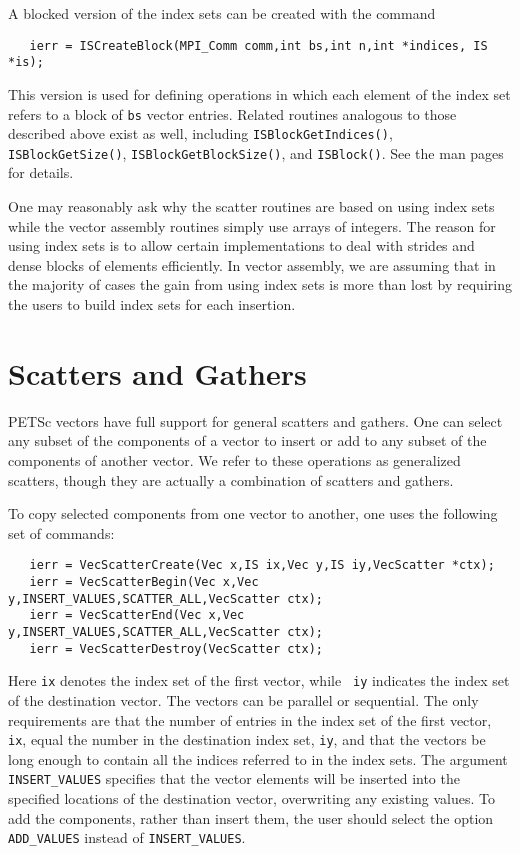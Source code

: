 A blocked version of the index sets can be created with the command
\begin{verbatim}
   ierr = ISCreateBlock(MPI_Comm comm,int bs,int n,int *indices, IS *is);
\end{verbatim}
This version is used for defining operations in which each element of the index
set refers to a block of {\tt bs} vector entries.  Related routines analogous
to those described above exist as well, including
{\tt ISBlockGetIndices()}, {\tt ISBlockGetSize()}, {\tt ISBlockGetBlockSize()},
and {\tt ISBlock()}. See the man pages for details.
  

One may reasonably ask why the scatter routines are based on 
using index sets while the vector assembly routines simply use 
arrays of integers. The reason for using index sets is to allow certain 
implementations to deal with strides and dense blocks of elements 
efficiently. In vector assembly, we are assuming that in the majority of 
cases the gain from using index sets is more than lost by requiring 
the users to build index sets for each insertion. 

\section{Scatters and Gathers}  
\label{sec:scatter}

PETSc vectors have full support for general scatters and 
gathers. One can select any subset of the components of a vector to
insert or add to any subset of the components of another vector.
We refer to these operations as generalized scatters, though they are 
actually a combination of scatters and gathers. 

 
 
 
To copy selected components from one vector 
to another, one uses the following set of commands:
\begin{verbatim}
   ierr = VecScatterCreate(Vec x,IS ix,Vec y,IS iy,VecScatter *ctx);
   ierr = VecScatterBegin(Vec x,Vec y,INSERT_VALUES,SCATTER_ALL,VecScatter ctx);
   ierr = VecScatterEnd(Vec x,Vec y,INSERT_VALUES,SCATTER_ALL,VecScatter ctx);
   ierr = VecScatterDestroy(VecScatter ctx);
\end{verbatim} 
Here {\tt ix} denotes the index set of the first vector, while {\tt
iy} indicates the index set of the destination vector.  The vectors
can be parallel or sequential. The only requirements are that the
number of entries in the index set of the first vector, {\tt ix},
equal the number in the destination index set, {\tt iy}, and that the
vectors be long enough to contain all the indices referred to in the
index sets.  The argument {\tt INSERT\_VALUES} specifies that the
vector elements will be inserted into the specified locations of the
destination vector, overwriting any existing values.  To add the
components, rather than insert them, the user should select the option
{\tt ADD\_VALUES}  instead of {\tt INSERT\_VALUES}.

